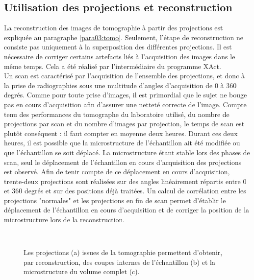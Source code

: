 	\subsection{Utilisation des projections et reconstruction}
		La reconstruction des images de tomographie à partir des projections est expliquée au paragraphe \ref{para03:tomo}. Seulement, l'étape de reconstruction ne consiste pas uniquement à la superposition des différentes projections. Il est nécessaire de corriger certains artefacts liés à l'acquisition des images dans le même temps. Cela a été réalisé par l'intermédiaire du programme XAct.
		\\Un scan est caractérisé par l'acquisition de l'ensemble des projections, et donc à la prise de radiographies sous une multitude d'angles d'acquisition de $0$ à $360$ degrés. Comme pour toute prise d'images, il est primordial que le sujet ne bouge pas en cours d'acquisition afin d'assurer une netteté correcte de l'image. Compte tenu des performances du tomographe du laboratoire utilisé, du nombre de projections par scan et du nombre d'images par projection, le temps de scan est plutôt conséquent : il faut compter en moyenne deux heures. Durant ces deux heures, il est possible que la microstructure de l'échantillon ait été modifiée ou que l'échantillon se soit déplacé. La microstructure étant stable lors des phases de scan, seul le déplacement de l'échantillon en cours d'acquisition des projections est observé. Afin de tenir compte de ce déplacement en cours d'acquisition, trente-deux projections sont réalisées sur des angles linéairement répartis entre $0$ et $360$ degrés et sur des positions déjà traitées. Un calcul de corrélation entre les projections "normales" et les projections en fin de scan permet d'établir le déplacement de l'échantillon en cours d'acquisition et de corriger la position de la microstructure lors de la reconstruction.
		\begin{figure}\centering
			\\
			\hfill
			\caption{\label{fig04:reconstruction_tomo}Les projections (a) issues de la tomographie permettent d'obtenir, par reconstruction, des coupes internes de l'échantillon (b) et la microstructure du volume complet (c).}
		\end{figure}
